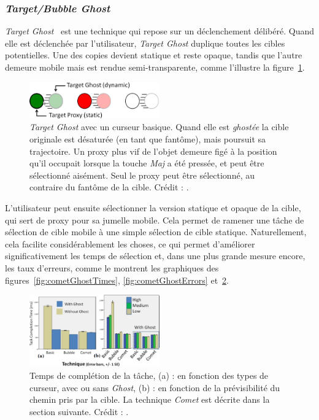 	\subsubsection{\emph{Target/Bubble Ghost}}
	\emph{Target Ghost}~\cite{hasan2011comet} est une technique qui repose sur un déclenchement délibéré. Quand elle est déclenchée par l'utilisateur, \emph{Target Ghost} duplique toutes les cibles potentielles. Une des copies devient statique et reste opaque, tandis que l'autre demeure mobile mais est rendue semi-transparente, comme l'illustre la figure~\ref{fig:targetGhost}.
	
	\begin{figure}[!htbp]
		\centering
		\includegraphics[width=0.5\textwidth]{figures/ch2/targetGhost}
		\caption[La technique \emph{Target Ghost}]{\emph{Target Ghost} avec un curseur basique. Quand elle est \og \emph{ghostée} \fg{} la cible originale est désaturée (en tant que fantôme), mais poursuit sa trajectoire. Un proxy plus vif de l'objet demeure figé à la position qu'il occupait lorsque la touche \emph{Maj} a été pressée, et peut être sélectionné aisément. Seul le proxy peut être sélectionné, au contraire du fantôme de la cible. Crédit : \cite{hasan2011comet}.}
		\label{fig:targetGhost}
	\end{figure}
	
	L'utilisateur peut ensuite sélectionner la version statique et opaque de la cible, qui sert de proxy pour sa jumelle mobile. Cela permet de ramener une tâche de sélection de cible mobile à une simple sélection de cible statique. Naturellement, cela facilite considérablement les choses, ce qui permet d'améliorer significativement les temps de sélection et, dans une plus grande mesure encore, les taux d'erreurs, comme le montrent les graphiques des figures~\ref{fig:cometGhostTimes}, \ref{fig:cometGhostErrors} et~\ref{fig:cometGhostPredictability}.

	\begin{figure}
		\centering
		\includegraphics[width=0.5\textwidth]{figures/ch2/cometGhostPredictability}
		\caption[\emph{Comet/Ghost}, prévisibilité et résultats]{Temps de complétion de la tâche, (a) : en fonction des types de curseur, avec ou sans \emph{Ghost}, (b) : en fonction de la prévisibilité du chemin pris par la cible. La technique \emph{Comet} est décrite dans la section suivante. Crédit : \cite{hasan2011comet}.}
		\label{fig:cometGhostPredictability}
	\end{figure}

